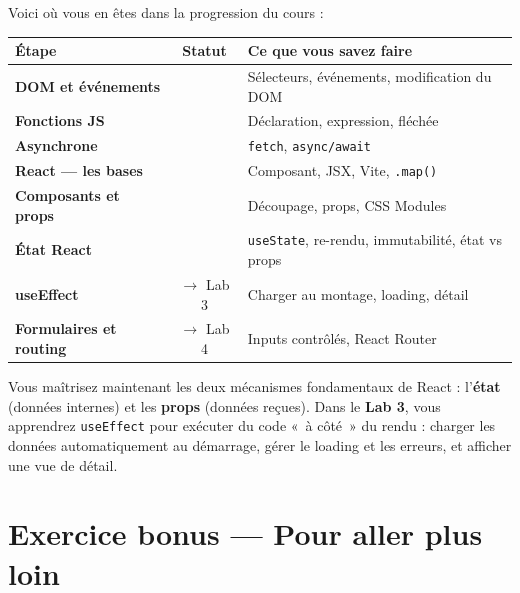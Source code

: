 \documentclass[11pt,a4paper]{article}
\newcommand{\cmark}{\ding{51}}
\begin{document}
Voici où vous en êtes dans la progression du cours :

\begin{center}
\begin{tabular}{lcp{7.5cm}}
\toprule
\textbf{Étape} & \textbf{Statut} & \textbf{Ce que vous savez faire} \\
\midrule
\textbf{DOM et événements} & \cmark{} & Sélecteurs, événements, modification du DOM \\
\textbf{Fonctions JS} & \cmark{} & Déclaration, expression, fléchée \\
\textbf{Asynchrone} & \cmark{} & \texttt{fetch}, \texttt{async/await} \\
\textbf{React --- les bases} & \cmark{} & Composant, JSX, Vite, \texttt{.map()} \\
\textbf{Composants et props} & \cmark{} & Découpage, props, CSS Modules \\
\textbf{État React} & \cmark{} & \texttt{useState}, re-rendu, immutabilité, état vs props \\
\textbf{useEffect} & $\to$ Lab 3 & Charger au montage, loading, détail \\
\textbf{Formulaires et routing} & $\to$ Lab 4 & Inputs contrôlés, React Router \\
\bottomrule
\end{tabular}
\end{center}

\begin{projetbox}[Et ensuite ?]
Vous maîtrisez maintenant les deux mécanismes fondamentaux de React : l'\textbf{état} (données internes) et les \textbf{props} (données reçues). Dans le \textbf{Lab 3}, vous apprendrez \texttt{useEffect} pour exécuter du code «~à côté~» du rendu : charger les données automatiquement au démarrage, gérer le loading et les erreurs, et afficher une vue de détail.
\end{projetbox}

\section*{Exercice bonus --- Pour aller plus loin}
\end{document}
